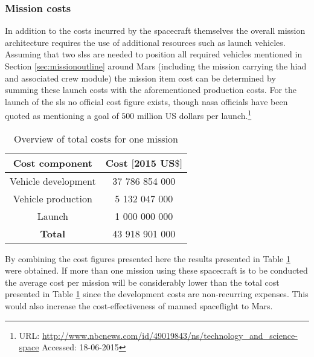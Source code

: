 \subsubsection{Mission costs}
In addition to the costs incurred by the spacecraft themselves the overall mission architecture requires the use of additional resources such as launch vehicles. Assuming that two \glspl{sls} are needed to position all required vehicles mentioned in Section \ref{sec:missionoutline} around Mars (including the mission carrying the \gls{hiad} and associated crew module) the mission item cost can be determined by summing these launch costs with the aforementioned production costs. For the launch of the \gls{sls} no official cost figure exists, though \gls{nasa} officials have been quoted as mentioning a goal of $500$ million US dollars per launch.\footnote{URL: \url{http://www.nbcnews.com/id/49019843/ns/technology_and_science-space} Accessed: 18-06-2015}\\
\begin{table}[h]
	\centering
	\caption{Overview of total costs for one mission}
	\begin{tabular}{|c|c|}
		\hline
		\textbf{Cost component} & \textbf{Cost $\mathbf{[2015}$ $\mathbf{US\$]}$} \\ \hline 
		\hline
		Vehicle development & 37 786 854 000 \\
		Vehicle production & 5 132 047 000\\
		Launch & 1 000 000 000\\ \hline
		\textbf{Total} & 43 918 901 000\\ \hline
	\end{tabular}
	\label{tab:missioncosts}
\end{table}
By combining the cost figures presented here the results presented in Table \ref{tab:missioncosts} were obtained. If more than one mission using these spacecraft is to be conducted the average cost per mission will be considerably lower than the total cost presented in Table \ref{tab:missioncosts} since the development costs are non-recurring expenses. This would also increase the cost-effectiveness of manned spaceflight to Mars.